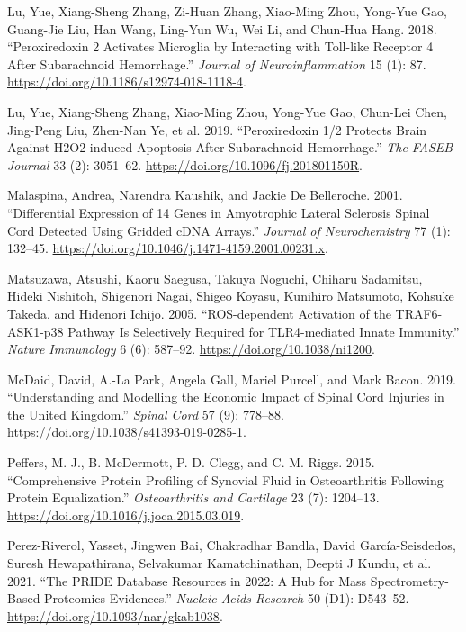 \documentclass[
]{article}
\newlength{\cslhangindent}
\newlength{\cslentryspacingunit} %
\newenvironment{CSLReferences}[2] %
 {%
  \setlength{\parindent}{0pt}
  \ifodd #1
  \let\oldpar\par
  \def\par{\hangindent=\cslhangindent\oldpar}
  \fi
  \setlength{\parskip}{#2\cslentryspacingunit}
 }%
 {}
\begin{document}
\begin{landscape}
\begin{landscape}
\begin{CSLReferences}{1}{0}
\leavevmode{}%
Lu, Yue, Xiang-Sheng Zhang, Zi-Huan Zhang, Xiao-Ming Zhou, Yong-Yue Gao, Guang-Jie Liu, Han Wang, Ling-Yun Wu, Wei Li, and Chun-Hua Hang. 2018. {``Peroxiredoxin 2 Activates Microglia by Interacting with {Toll-like} Receptor 4 After Subarachnoid Hemorrhage.''} \emph{Journal of Neuroinflammation} 15 (1): 87. \url{https://doi.org/10.1186/s12974-018-1118-4}.

\leavevmode{}%
Lu, Yue, Xiang-Sheng Zhang, Xiao-Ming Zhou, Yong-Yue Gao, Chun-Lei Chen, Jing-Peng Liu, Zhen-Nan Ye, et al. 2019. {``Peroxiredoxin 1/2 Protects Brain Against {H2O2-induced} Apoptosis After Subarachnoid Hemorrhage.''} \emph{The FASEB Journal} 33 (2): 3051--62. \url{https://doi.org/10.1096/fj.201801150R}.

\leavevmode{}%
Malaspina, Andrea, Narendra Kaushik, and Jackie De Belleroche. 2001. {``Differential Expression of 14 Genes in Amyotrophic Lateral Sclerosis Spinal Cord Detected Using Gridded {cDNA} Arrays.''} \emph{Journal of Neurochemistry} 77 (1): 132--45. \url{https://doi.org/10.1046/j.1471-4159.2001.00231.x}.

\leavevmode{}%
Matsuzawa, Atsushi, Kaoru Saegusa, Takuya Noguchi, Chiharu Sadamitsu, Hideki Nishitoh, Shigenori Nagai, Shigeo Koyasu, Kunihiro Matsumoto, Kohsuke Takeda, and Hidenori Ichijo. 2005. {``{ROS-dependent} Activation of the {TRAF6-ASK1-p38} Pathway Is Selectively Required for {TLR4-mediated} Innate Immunity.''} \emph{Nature Immunology} 6 (6): 587--92. \url{https://doi.org/10.1038/ni1200}.

\leavevmode{}%
McDaid, David, A.-La Park, Angela Gall, Mariel Purcell, and Mark Bacon. 2019. {``Understanding and Modelling the Economic Impact of Spinal Cord Injuries in the {United Kingdom}.''} \emph{Spinal Cord} 57 (9): 778--88. \url{https://doi.org/10.1038/s41393-019-0285-1}.

\leavevmode{}%
Peffers, M. J., B. McDermott, P. D. Clegg, and C. M. Riggs. 2015. {``Comprehensive Protein Profiling of Synovial Fluid in Osteoarthritis Following Protein Equalization.''} \emph{Osteoarthritis and Cartilage} 23 (7): 1204--13. \url{https://doi.org/10.1016/j.joca.2015.03.019}.

\leavevmode{}%
Perez-Riverol, Yasset, Jingwen Bai, Chakradhar Bandla, David García-Seisdedos, Suresh Hewapathirana, Selvakumar Kamatchinathan, Deepti J Kundu, et al. 2021. {``The {PRIDE} Database Resources in 2022: A Hub for Mass Spectrometry-Based Proteomics Evidences.''} \emph{Nucleic Acids Research} 50 (D1): D543--52. \url{https://doi.org/10.1093/nar/gkab1038}.


\end{CSLReferences}
\end{landscape}
\end{landscape}
\end{document}
